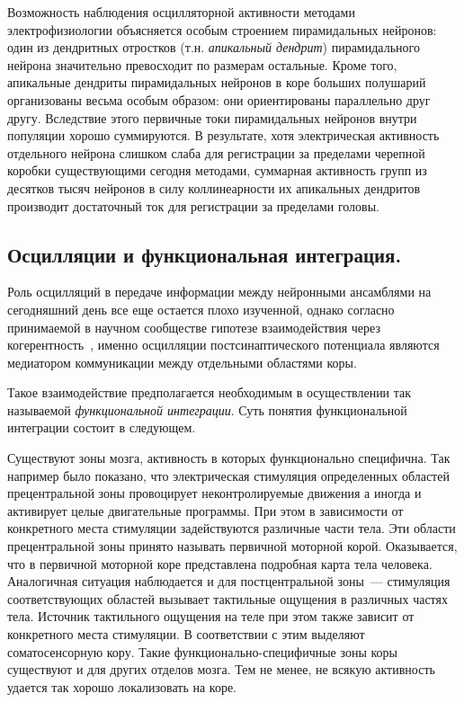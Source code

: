 Возможность наблюдения осцилляторной активности методами электрофизиологии
объясняется особым строением пирамидальных нейронов:
один из дендритных отростков (т.н. \emph{апикальный дендрит}) пирамидального нейрона значительно превосходит по
размерам остальные.  Кроме того, апикальные дендриты пирамидальных нейронов в коре больших
полушарий организованы весьма особым образом: они ориентированы параллельно друг другу.
Вследствие этого первичные токи пирамидальных нейронов внутри популяции
хорошо суммируются. В результате, хотя электрическая активность отдельного нейрона
слишком слаба для регистрации за пределами черепной коробки существующими
сегодня методами, суммарная активность групп из десятков тысяч
нейронов в силу коллинеарности их апикальных дендритов производит достаточный
ток для регистрации за пределами головы.

\subsection{Осцилляции и функциональная интеграция.}
Роль осцилляций в передаче информации между нейронными ансамблями на
сегодняшний день все еще остается плохо изученной, однако согласно принимаемой
в научном сообществе гипотезе взаимодействия через когерентность~\cite{Fries2015},
именно осцилляции постсинаптического потенциала являются медиатором
коммуникации между отдельными областями коры.

Такое взаимодействие предполагается необходимым в осуществлении так называемой
\emph{функциональной интеграции}. Суть понятия функциональной интеграции
состоит в следующем.

Существуют зоны мозга, активность в которых
функционально специфична. Так например было показано, что электрическая
стимуляция определенных областей прецентральной зоны провоцирует
неконтролируемые движения а иногда и активирует целые двигательные программы.
При этом в зависимости от конкретного места стимуляции задействуются различные
части тела.  Эти области прецентральной зоны принято называть первичной
моторной корой.  Оказывается, что в первичной моторной коре представлена
подробная карта тела человека.  Аналогичная ситуация наблюдается и для
постцентральной зоны~--- стимуляция соответствующих областей вызывает
тактильные ощущения в различных частях тела. Источник тактильного ощущения на
теле при этом также зависит от конкретного места стимуляции. В соответствии с
этим выделяют соматосенсорную кору. Такие функционально-специфичные зоны коры
существуют и для других отделов мозга. Тем не менее, не всякую активность
удается так хорошо локализовать на коре.

